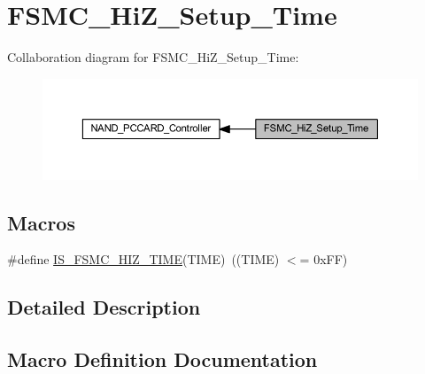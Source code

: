 \hypertarget{group___f_s_m_c___hi_z___setup___time}{}\section{F\+S\+M\+C\+\_\+\+Hi\+Z\+\_\+\+Setup\+\_\+\+Time}
\label{group___f_s_m_c___hi_z___setup___time}
Collaboration diagram for F\+S\+M\+C\+\_\+\+Hi\+Z\+\_\+\+Setup\+\_\+\+Time\+:
\nopagebreak
\begin{figure}[H]
\begin{center}
\leavevmode
\includegraphics[width=350pt]{group___f_s_m_c___hi_z___setup___time}
\end{center}
\end{figure}
\subsection*{Macros}
\begin{DoxyCompactItemize}
\item 
\#define \hyperlink{group___f_s_m_c___hi_z___setup___time_gaeb6295e8cc1a524f060c5e780f868033}{I\+S\+\_\+\+F\+S\+M\+C\+\_\+\+H\+I\+Z\+\_\+\+T\+I\+ME}(T\+I\+ME)~((T\+I\+ME) $<$= 0x\+F\+F)
\end{DoxyCompactItemize}


\subsection{Detailed Description}


\subsection{Macro Definition Documentation}
\mbox{\label{group___f_s_m_c___hi_z___setup___time_gaeb6295e8cc1a524f060c5e780f868033}} 
